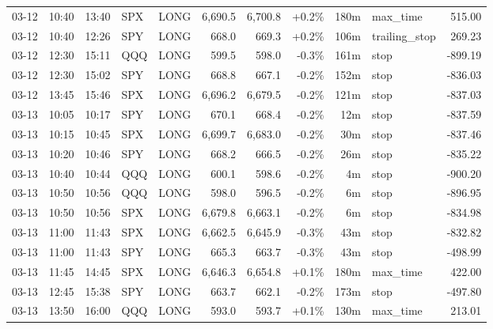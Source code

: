 \documentclass[11pt,a4paper,twoside]{article}
\begin{document}
\begin{center}
\begin{longtable}{>{\color{txtmain}}l l l l l r r r r >{\color{txtmain}}l r}
03-12 & 10:40 & 13:40 & SPX & LONG & 6,690.5 & 6,700.8 & \textcolor{wingreen}{+0.2\%} & 180m & max\_time & \textcolor{wingreen}{515.00} \\
03-12 & 10:40 & 12:26 & SPY & LONG & 668.0 & 669.3 & \textcolor{wingreen}{+0.2\%} & 106m & trailing\_stop & \textcolor{wingreen}{269.23} \\
03-12 & 12:30 & 15:11 & QQQ & LONG & 599.5 & 598.0 & \textcolor{lossred}{-0.3\%} & 161m & stop & \textcolor{lossred}{-899.19} \\
03-12 & 12:30 & 15:02 & SPY & LONG & 668.8 & 667.1 & \textcolor{lossred}{-0.2\%} & 152m & stop & \textcolor{lossred}{-836.03} \\
03-12 & 13:45 & 15:46 & SPX & LONG & 6,696.2 & 6,679.5 & \textcolor{lossred}{-0.2\%} & 121m & stop & \textcolor{lossred}{-837.03} \\
03-13 & 10:05 & 10:17 & SPY & LONG & 670.1 & 668.4 & \textcolor{lossred}{-0.2\%} & 12m & stop & \textcolor{lossred}{-837.59} \\
03-13 & 10:15 & 10:45 & SPX & LONG & 6,699.7 & 6,683.0 & \textcolor{lossred}{-0.2\%} & 30m & stop & \textcolor{lossred}{-837.46} \\
03-13 & 10:20 & 10:46 & SPY & LONG & 668.2 & 666.5 & \textcolor{lossred}{-0.2\%} & 26m & stop & \textcolor{lossred}{-835.22} \\
03-13 & 10:40 & 10:44 & QQQ & LONG & 600.1 & 598.6 & \textcolor{lossred}{-0.2\%} & 4m & stop & \textcolor{lossred}{-900.20} \\
03-13 & 10:50 & 10:56 & QQQ & LONG & 598.0 & 596.5 & \textcolor{lossred}{-0.2\%} & 6m & stop & \textcolor{lossred}{-896.95} \\
03-13 & 10:50 & 10:56 & SPX & LONG & 6,679.8 & 6,663.1 & \textcolor{lossred}{-0.2\%} & 6m & stop & \textcolor{lossred}{-834.98} \\
03-13 & 11:00 & 11:43 & SPX & LONG & 6,662.5 & 6,645.9 & \textcolor{lossred}{-0.3\%} & 43m & stop & \textcolor{lossred}{-832.82} \\
03-13 & 11:00 & 11:43 & SPY & LONG & 665.3 & 663.7 & \textcolor{lossred}{-0.3\%} & 43m & stop & \textcolor{lossred}{-498.99} \\
03-13 & 11:45 & 14:45 & SPX & LONG & 6,646.3 & 6,654.8 & \textcolor{wingreen}{+0.1\%} & 180m & max\_time & \textcolor{wingreen}{422.00} \\
03-13 & 12:45 & 15:38 & SPY & LONG & 663.7 & 662.1 & \textcolor{lossred}{-0.2\%} & 173m & stop & \textcolor{lossred}{-497.80} \\
03-13 & 13:50 & 16:00 & QQQ & LONG & 593.0 & 593.7 & \textcolor{wingreen}{+0.1\%} & 130m & max\_time & \textcolor{wingreen}{213.01} \\

\end{longtable}
\end{center}
\end{document}
